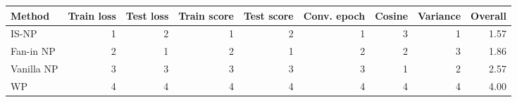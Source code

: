 \begin{tabular}{lrrrrrrrr}
\toprule
Method & Train loss & Test loss & Train score & Test score & Conv. epoch & Cosine & Variance & Overall \\
\midrule
IS-NP & 1 & 2 & 1 & 2 & 1 & 3 & 1 & 1.57 \\
Fan-in NP & 2 & 1 & 2 & 1 & 2 & 2 & 3 & 1.86 \\
Vanilla NP & 3 & 3 & 3 & 3 & 3 & 1 & 2 & 2.57 \\
WP & 4 & 4 & 4 & 4 & 4 & 4 & 4 & 4.00 \\
\bottomrule
\end{tabular}
